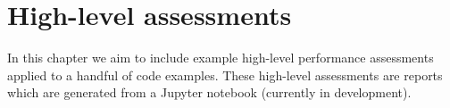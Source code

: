 \chapter{High-level assessments}
\label{chapter:high-level-assessments}

\begin{wip}
    In this chapter we aim to include example high-level performance assessments applied to a handful of code examples. These high-level assessments are reports which are generated from a Jupyter notebook (currently in development).
\end{wip}